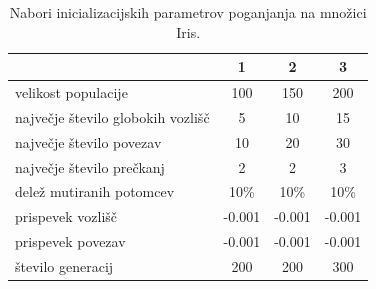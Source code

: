 \begin{table}[H]
    \begin{center}
        \begin{tabular}{||l c c c||}
            \hline
            & 1      & 2      & 3 \\ [0.5ex]
            \hline
            velikost populacije               & 100    & 150    & 200    \\
            \hline
            največje število globokih vozlišč & 5      & 10     & 15     \\
            \hline
            največje število povezav          & 10     & 20     & 30     \\
            \hline
            največje število prečkanj         & 2      & 2      & 3      \\
            \hline
            delež mutiranih potomcev          & 10\%   & 10\%   & 10\%   \\
            \hline
            prispevek vozlišč                 & -0.001 & -0.001 & -0.001 \\
            \hline
            prispevek povezav                 & -0.001 & -0.001 & -0.001 \\
            \hline
            število generacij                 & 200    & 200    & 300    \\
            \hline
        \end{tabular}
    \end{center}
    \caption{Nabori inicializacijskih parametrov poganjanja na množici Iris.}
    \label{tab:param_iris}
\end{table}

